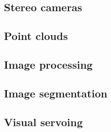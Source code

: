 \subsection{Stereo cameras}
\label{subsec:stereo_cameras}


\subsection{Point clouds}
\label{subsec:point_clouds}


\subsection{Image processing}
\label{subsec:image_processing}


\subsection{Image segmentation}
\label{subsec:image_segmentation}


\subsection{Visual servoing}
\label{subsec:visual_servoing}


